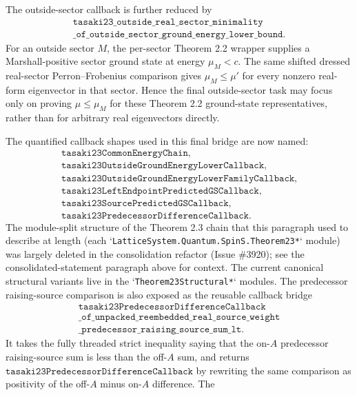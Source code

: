 \documentclass[a4paper,11pt]{article}
\begin{document}
The outside-sector callback is further reduced by
\[
\begin{gathered}
\texttt{tasaki23\_outside\_real\_sector\_minimality}\\
\texttt{\_of\_outside\_sector\_ground\_energy\_lower\_bound}.
\end{gathered}
\]
For an outside sector \(M\), the per-sector Theorem 2.2 wrapper supplies
a Marshall-positive sector ground state at energy \(\mu_M<c\).  The
same shifted dressed real-sector Perron--Frobenius comparison gives
\(\mu_M\le \mu'\) for every nonzero real-form eigenvector in that
sector.  Hence the final outside-sector task may focus only on proving
\(\mu\le\mu_M\) for these Theorem 2.2 ground-state representatives,
rather than for arbitrary real eigenvectors directly.

The quantified callback shapes used in this final bridge are now named:
\[
\begin{gathered}
\texttt{tasaki23CommonEnergyChain},\\
\texttt{tasaki23OutsideGroundEnergyLowerCallback},\\
\texttt{tasaki23OutsideGroundEnergyLowerFamilyCallback},\\
\texttt{tasaki23LeftEndpointPredictedGSCallback},\\
\texttt{tasaki23SourcePredictedGSCallback},\\
\texttt{tasaki23PredecessorDifferenceCallback}.
\end{gathered}
\]
The module-split structure of the Theorem 2.3 chain that this paragraph used to describe at length (each `\texttt{LatticeSystem.Quantum.SpinS.Theorem23*}` module) was largely deleted in the consolidation refactor (Issue \#3920); see the consolidated-statement paragraph above for context. The current canonical structural variants live in the `\texttt{Theorem23Structural*}` modules.
The predecessor raising-source comparison is also exposed as the reusable
callback bridge
\[
\begin{gathered}
\texttt{tasaki23PredecessorDifferenceCallback}\\
\texttt{\_of\_unpacked\_reembedded\_real\_source\_weight}\\
\texttt{\_predecessor\_raising\_source\_sum\_lt}.
\end{gathered}
\]
It takes the fully threaded strict inequality saying that the on-\(A\)
predecessor raising-source sum is less than the off-\(A\) sum, and returns
\(\texttt{tasaki23PredecessorDifferenceCallback}\) by rewriting the same
comparison as positivity of the off-\(A\) minus on-\(A\) difference.  The
\end{document}
